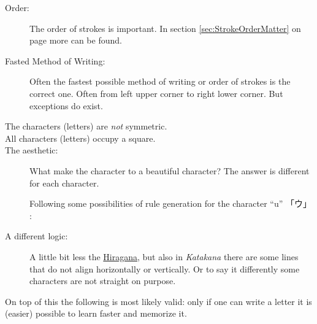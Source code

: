 \begin{description}

\item[Order:] The order of strokes is important. In section
\ref{sec:StrokeOrderMatter} on page \pageref{sec:StrokeOrderMatter} more can be
found.

\item[Fasted Method of Writing:] Often the fastest possible method of writing
or order of strokes is the correct one.  Often from left upper corner to right
lower corner. But exceptions do exist.

\item[The characters (letters) are \textit{not} symmetric.]

\item[All characters (letters) occupy a square.]

\item[The aesthetic:] What make the character to a beautiful character? The
answer is different for each character.

Following some possibilities of rule generation for the character ``u''
 {「ウ」 }:

\bigskip {}

\bigskip {}


\bigskip {}


\bigskip {}

\bigskip

\item[A different logic:] A little bit less the
\hyperref[sec:Hiragana]{Hiragana}, but also in \textit{Katakana} there are some
lines that do not align horizontally  or vertically. Or to say it differently
some characters are not straight on purpose.

\end{description}

On top of this the following is most likely valid: only if one can write a
letter it is (easier) possible to learn faster and memorize it.


